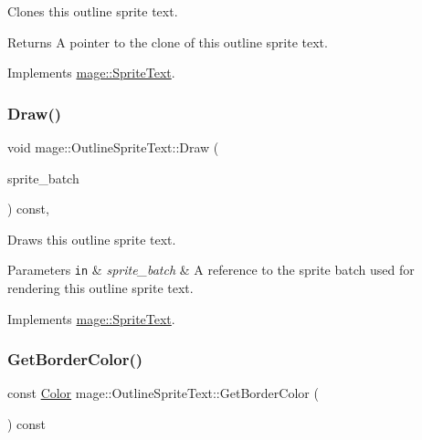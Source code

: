 Clones this outline sprite text.

\begin{DoxyReturn}{Returns}
A pointer to the clone of this outline sprite text. 
\end{DoxyReturn}


Implements \hyperlink{classmage_1_1_sprite_text_aa2c63346f5ad7f63f7a6d474df3556ef}{mage\+::\+Sprite\+Text}.

\hypertarget{classmage_1_1_outline_sprite_text_a524e9ad1caeeeaa32405e61d1a5e1032}{}\label{classmage_1_1_outline_sprite_text_a524e9ad1caeeeaa32405e61d1a5e1032} 
\subsubsection{\texorpdfstring{Draw()}{Draw()}}
{\footnotesize\ttfamily void mage\+::\+Outline\+Sprite\+Text\+::\+Draw (\begin{DoxyParamCaption}\item[{\hyperlink{classmage_1_1_sprite_batch}{Sprite\+Batch} \&}]{sprite\+\_\+batch }\end{DoxyParamCaption}) const\hspace{0.3cm}{\ttfamily [override]}, {\ttfamily [virtual]}}

Draws this outline sprite text.


\begin{DoxyParams}[1]{Parameters}
\mbox{\tt in}  & {\em sprite\+\_\+batch} & A reference to the sprite batch used for rendering this outline sprite text. \\
\hline
\end{DoxyParams}


Implements \hyperlink{classmage_1_1_sprite_text_a45d5ac8410d5a46b26e8491946a2ad9e}{mage\+::\+Sprite\+Text}.

\hypertarget{classmage_1_1_outline_sprite_text_adb4936119bcc0b148c9e11f021e83940}{}\label{classmage_1_1_outline_sprite_text_adb4936119bcc0b148c9e11f021e83940} 
\subsubsection{\texorpdfstring{Get\+Border\+Color()}{GetBorderColor()}}
{\footnotesize\ttfamily const \hyperlink{structmage_1_1_color}{Color} mage\+::\+Outline\+Sprite\+Text\+::\+Get\+Border\+Color (\begin{DoxyParamCaption}{ }\end{DoxyParamCaption}) const\hspace{0.3cm}{\ttfamily [noexcept]}}

